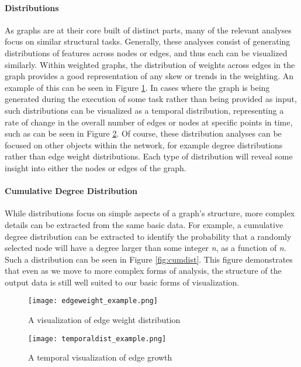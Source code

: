 \paragraph{Distributions}
As graphs are at their core built of distinct parts, many of the relevant analyses focus on similar structural tasks. Generally, these analyses consist of generating distributions of features across nodes or edges, and thus each can be visualized similarly. Within weighted graphs, the distribution of weights across edges in the graph provides a good representation of any skew or trends in the weighting. An example of this can be seen in Figure \ref{fig:edgeweight}. In cases where the graph is being generated during the execution of some task rather than being provided as input, such distributions can be visualized as a temporal distribution, representing a rate of change in the overall number of edges or nodes at specific points in time, such as can be seen in Figure \ref{fig:temporaldist}. Of course, these distribution analyses can be focused on other objects within the network, for example degree distributions rather than edge weight distributions. Each type of distribution will reveal some insight into either the nodes or edges of the graph. 

\paragraph{Cumulative Degree Distribution}
While distributions focus on simple aspects of a graph's structure, more complex details can be extracted from the same basic data. For example, a cumulative degree distribution can be extracted to identify the probability that a randomly selected node will have a degree larger than some integer \emph{n}, as a function of \emph{n}. Such a distribution can be seen in Figure \ref{fig:cumdist}. This figure demonstrates that even as we move to more complex forms of analysis, the structure of the output data is still well suited to our basic forms of visualization. 

\begin{figure}
	\centering
	\texttt{[image: edgeweight\_example.png]}
	\caption{A visualization of edge weight distribution \cite{KONECT}}
	\label{fig:edgeweight}
\end{figure}

\begin{figure}
	\centering
	\texttt{[image: temporaldist\_example.png]}
	\caption{A temporal visualization of edge growth \cite{KONECT}}
	\label{fig:temporaldist}
\end{figure}

